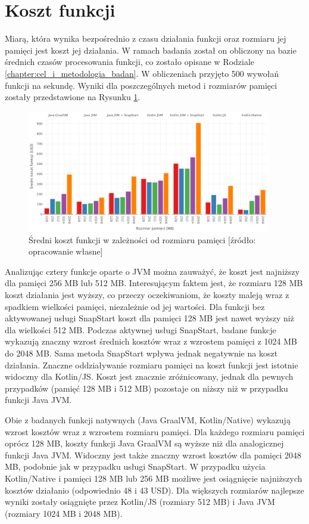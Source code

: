 \section{Koszt funkcji}\label{chapter:results_cost}

Miarą, która wynika bezpośrednio z czasu działania funkcji oraz rozmiaru jej pamięci jest koszt jej działania.
W ramach badania został on obliczony na bazie średnich czasów procesowania funkcji, co zostało opisane w Rodziale \ref{chapter:cel_i_metodologia_badan}.
W obliczeniach przyjęto 500 wywołań funkcji na sekundę.
Wyniki dla poszczególnych metod i rozmiarów pamięci zostały przedstawione na Rysunku \ref{fig:avg_costs}.

\begin{figure}[h]
    \centering
    \includegraphics[width=0.95\textwidth]{charts/results/average-cost.png}
    \caption{Średni koszt funkcji w zależności od rozmiaru pamięci [źródło: opracowanie własne]}
    \label{fig:avg_costs}
\end{figure}

Analizując cztery funkcje oparte o JVM można zauważyć, że koszt jest najniższy dla pamięci 256 MB lub 512 MB.
Interesującym faktem jest, że rozmiaru 128 MB koszt działania jest wyższy, co przeczy oczekiwaniom, że koszty maleją wraz z spadkiem wielkości pamięci, niezależnie od jej wartości.
Dla funkcji bez aktywowanej usługi SnapStart koszt dla pamięci 128 MB jest nawet wyższy niż dla wielkości 512 MB.
Podczas aktywnej usługi SnapStart, badane funkcje wykazują znaczny wzrost średnich kosztów wraz z wzrostem pamięci z 1024 MB do 2048 MB.
Sama metoda SnapStart wpływa jednak negatywnie na koszt działania.
Znaczne oddziaływanie rozmiaru pamięci na koszt funkcji jest istotnie widoczny dla Kotlin/JS.
Koszt jest znacznie zróżnicowany, jednak dla pewnych przypadków (pamięć 128 MB i 512 MB) pozostaje on niższy niż w przypadku funkcji Java JVM.

Obie z badanych funkcji natywnych (Java GraalVM, Kotlin/Native) wykazują wzrost kosztów wraz z wzrostem rozmiaru pamięci.
Dla każdego rozmiaru pamięci oprócz 128 MB, koszty funkcji Java GraalVM są wyższe niż dla analogicznej funkcji Java JVM.
Widoczny jest także znaczny wzrost kosztów dla pamięci 2048 MB, podobnie jak w przypadku usługi SnapStart.
W przypadku użycia Kotlin/Native i pamięci 128 MB lub 256 MB możliwe jest osiągnięcie najniższych kosztów działanio (odpowiednio 48 i 43 USD).
Dla większych rozmiarów najlepsze wyniki zostały osiągnięte przez Kotlin/JS (rozmiary 512 MB) i Java JVM (rozmiary 1024 MB i 2048 MB).
